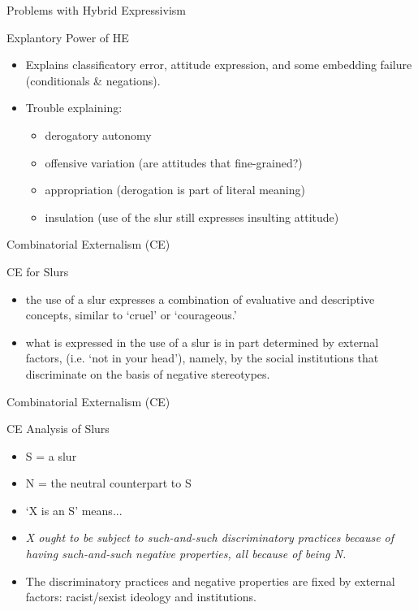 \documentclass[xcolor=dvipsnames,12pt,handout]{beamer}
\begin{document}
\begin{frame}{Problems with Hybrid Expressivism}
\begin{block}{Explantory Power of HE}
\pause
\begin{itemize}\setlength\itemsep{2.5mm}
 
\item Explains classificatory error, attitude expression, and some embedding failure (conditionals \& negations).
\pause
\item Trouble explaining:
\pause
\begin{itemize}\setlength\itemsep{2.5mm}
\item derogatory autonomy
\pause
\item offensive variation (are attitudes that fine-grained?)
\pause
\item appropriation (derogation is part of literal meaning)
\pause
\item insulation (use of the slur still expresses insulting attitude)
\end{itemize} 

\end{itemize}
\end{block}
\end{frame}


\begin{frame}{Combinatorial Externalism (CE)}
\pause
\begin{block}{CE for Slurs}
\begin{itemize}
\item the use of a slur expresses a \alert{combination} of evaluative and descriptive concepts, similar to `cruel' or `courageous.'
\pause
\item what is expressed in the use of a slur is in part determined by \alert{external} factors, (i.e. `not in your head'), namely, by the social institutions that discriminate on the basis of negative stereotypes.
\end{itemize}
\end{block}
\end{frame}

\begin{frame}{Combinatorial Externalism (CE)}

\begin{block}{CE Analysis of Slurs}
\pause
\begin{itemize}
\item S = a slur
\pause
\item N = the neutral counterpart to S
\pause 
\item `X is an S' means...
\pause
\item \textit{X ought to be subject to such-and-such discriminatory practices because of having such-and-such negative properties, all because of being N.}
\pause
\item The discriminatory practices and negative properties are fixed by external factors: racist/sexist ideology and institutions.
\end{itemize}
\end{block}

\end{frame}
\end{document}
